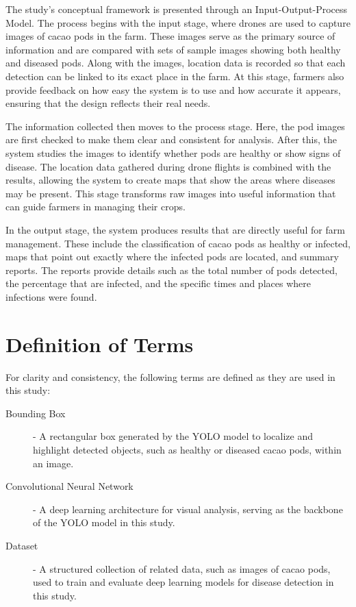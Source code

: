 {The study's conceptual framework is presented through an Input-Output-Process Model. The process begins with the input stage, where drones are used to capture images of cacao pods in the farm. These images serve as the primary source of information and are compared with sets of sample images showing both healthy and diseased pods. Along with the images, location data is recorded so that each detection can be linked to its exact place in the farm. At this stage, farmers also provide feedback on how easy the system is to use and how accurate it appears, ensuring that the design reflects their real needs.

The information collected then moves to the process stage. Here, the pod images are first checked to make them clear and consistent for analysis. After this, the system studies the images to identify whether pods are healthy or show signs of disease. The location data gathered during drone flights is combined with the results, allowing the system to create maps that show the areas where diseases may be present. This stage transforms raw images into useful information that can guide farmers in managing their crops.

In the output stage, the system produces results that are directly useful for farm management. These include the classification of cacao pods as healthy or infected, maps that point out exactly where the infected pods are located, and summary reports. The reports provide details such as the total number of pods detected, the percentage that are infected, and the specific times and places where infections were found.


\section{Definition of Terms}

For clarity and consistency, the following terms are defined as they are used in this study:

\begin{description}
	\item[Bounding Box] - A rectangular box generated by the YOLO model to localize and highlight detected objects, such as healthy or diseased cacao pods, within an image.
	
	\item[Convolutional Neural Network] - A deep learning architecture for visual analysis, serving as the backbone of the YOLO model in this study.
	
	
	\item[Dataset] - A structured collection of related data, such as images of cacao pods, used to train and evaluate deep learning models for disease detection in this study.


\end{description}}
